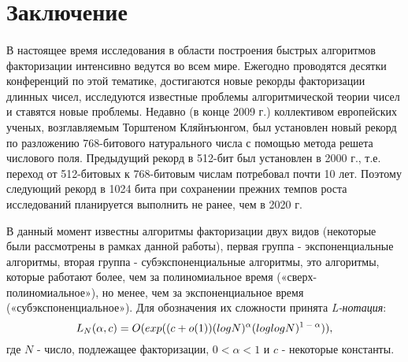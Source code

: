   
\section{Заключение}

\paragraph{} В настоящее время исследования в области построения быстрых алгоритмов факторизации интенсивно ведутся во всем мире. Ежегодно 
  проводятся десятки конференций по этой тематике, достигаются новые рекорды факторизации длинных чисел, исследуются известные проблемы 
  алгоритмической теории чисел и ставятся новые проблемы. Недавно (в конце 2009 г.) коллективом европейских ученых, возглавляемым Торштеном
  Кляйнъюнгом, был установлен новый рекорд по разложению 768-битового натурального числа с помощью метода решета числового поля. Предыдущий
  рекорд в 512-бит был установлен в 2000 г., т.е. переход от 512-битовых к 768-битовым числам потребовал почти 10 лет. Поэтому следующий 
  рекорд в 1024 бита при сохранении прежних темпов роста исследований планируется выполнить не ранее, чем в 2020 г.
  
  В данный момент известны алгоритмы факторизации двух видов (некоторые были рассмотрены в рамках данной работы), первая группа - экспоненциальные 
  алгоритмы, вторая группа - субэкспоненциальные алгоритмы, это алгоритмы, которые работают более, чем за полиномиальное время («сверх-полиномиальное»),
  но менее, чем за экспоненциальное время («субэкспоненциальное»). Для обозначения их сложности принята \textit{L-нотация}:  
    \begin{equation} \label{eq:prime-fact-lnc}
     L_N(\alpha,c)=O(exp((c+o(1))(logN)^\alpha(loglogN)\textsuperscript{{$1-\alpha$}})), 
    \end{equation}    
  где {$N$} - число, подлежащее факторизации, {$0 < \alpha < 1$}  и {$c$} - некоторые константы.
  
